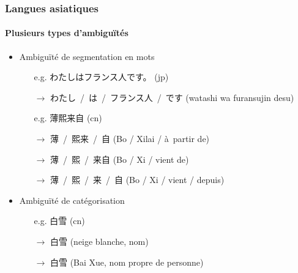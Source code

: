 \documentclass[11pt,aspectratio=43,dvipsnames,table]{beamer}
\begin{document}
\begin{frame}
    \frametitle{Langues asiatiques}
    \framesubtitle{Plusieurs types d'ambiguïtés~\cite{wang:approche:recital13}}
    \begin{itemize} \itemsep10pt
        \item Ambiguïté de segmentation en mots
        \begin{CJK}{UTF8}{min}
        \begin{itemize}
          \item[e.g.] わたしはフランス人です。 (jp)
          \item[$\to$] わたし~/~は~/~フランス人~/~です (watashi wa furansujin desu)
        \end{itemize}
        \end{CJK}
        \begin{CJK}{UTF8}{gbsn}
        \begin{itemize} 
          \item[e.g.] 薄熙来自 (cn)
          \item[$\to$] 薄~/~熙来~/~自 (Bo / Xilai / à~partir de)
          \item[$\to$] 薄~/~熙~/~来自 (Bo / Xi / vient de)
          \item[$\to$] 薄~/~熙~/~来~/~自 (Bo / Xi / vient / depuis)
        \end{itemize}
        \end{CJK}
        \item Ambiguïté de catégorisation
        \begin{CJK}{UTF8}{gbsn}
        \begin{itemize} 
          \item[e.g.] 白雪 (cn)
          \item[$\to$] 白雪 (neige blanche, nom)
          \item[$\to$] 白雪 (Bai Xue, nom propre de personne)
        \end{itemize}
        \end{CJK}
    \end{itemize}
\end{frame}
\end{document}

